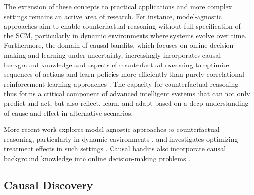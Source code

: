 The extension of these concepts to practical applications and more complex settings remains an active area of research. For instance, model-agnostic approaches aim to enable counterfactual reasoning without full specification of the SCM, particularly in dynamic environments where systems evolve over time. Furthermore, the domain of causal bandits, which focuses on online decision-making and learning under uncertainty, increasingly incorporates causal background knowledge and aspects of counterfactual reasoning to optimize sequences of actions and learn policies more efficiently than purely correlational reinforcement learning approaches \cite{Lattimore2016Causal, Lee2018Structural, Zhang2022Causal, Bilodeau2022Adaptively}. The capacity for counterfactual reasoning thus forms a critical component of advanced intelligent systems that can not only predict and act, but also reflect, learn, and adapt based on a deep understanding of cause and effect in alternative scenarios.

More recent work explores model-agnostic approaches to counterfactual reasoning, particularly in dynamic environments \cite{Berrevoets2021ModelAgnostic}, and investigates optimizing treatment effects in such settings \cite{Berrevoets2022Treatment}. Causal bandits also incorporate causal background knowledge into online decision-making problems \cite{Lattimore2016Causal, Lee2018Structural, Zhang2022Causal, Bilodeau2022Adaptively}.

\newpage

\subsection{Causal Discovery}

